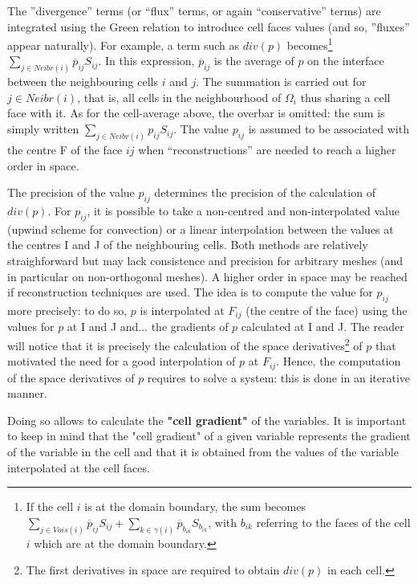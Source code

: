 The ''divergence'' terms (or ``flux'' terms, or again ``conservative''
terms) are integrated using the Green relation to introduce cell faces
values (and so, ''fluxes'' appear naturally). For example, a term such as $%
div(p)$ becomes\footnote{%
If the cell $i$ is at the domain boundary, the sum becomes $%
\sum\limits_{j\in Vois(i)}\overline{p}_{ij}S_{ij}+\sum\limits_{k\in \gamma
(i)}\overline{p}_{b_{ik}}S_{b_{ik}}$, with $b_{ik}$ referring to the faces
of the cell $i$ which are at the domain boundary.} $\sum\limits_{j\in
Neibr(i)}\overline{p}_{ij}S_{ij}$. In this expression, $\overline{p}_{ij}$
is the average of $p$ on the interface between the neighbouring cells $i$
and $j$. The summation is carried out for $j\in Neibr(i)$, that is, all
cells in the neighbourhood of $\Omega _{i}$ thus sharing a cell face with
it. As for the cell-average above, the overbar is omitted: the sum is simply
written $\sum\limits_{j\in Neibr(i)}p_{ij}S_{ij}$. The value $p_{ij}$ is
assumed to be associated with the centre F of the face $ij$ when
``reconstructions'' are needed to reach a higher order in space.

The precision of the value $p_{ij}$ determines the precision of the
calculation of $div(p)$. For $p_{ij}$, it is possible to take a non-centred
and non-interpolated value (upwind scheme for convection) or a linear
interpolation between the values at the centres I and J of the neighbouring
cells. Both methods are relatively straighforward but may lack consistence
and precision for arbitrary meshes (and in particular on non-orthogonal
meshes). A higher order in space may be reached if reconstruction techniques
are used. The idea is to compute the value for $p_{ij}$ more precisely: to
do so, $p$ is interpolated at $F_{ij}$ (the centre of the face) using the
values for $p$ at I and J and... the gradients of $p$ calculated at I and J.
The reader will notice that it is precisely the calculation of the space
derivatives\footnote{%
The first derivatives in space are required to obtain $div(p)$ in each cell.}
of $p$ that motivated the need for a good interpolation of $p$ at $F_{ij}$.
Hence, the computation of the space derivatives of $p$ requires to solve a
system: this is done in an iterative manner.

Doing so allows to calculate the \textbf{"cell gradient"} of the variables.
It is important to keep in mind that the "cell gradient" of a given variable
represents the gradient of the variable in the cell and that it is obtained
from the values of the variable interpolated at the cell faces.

